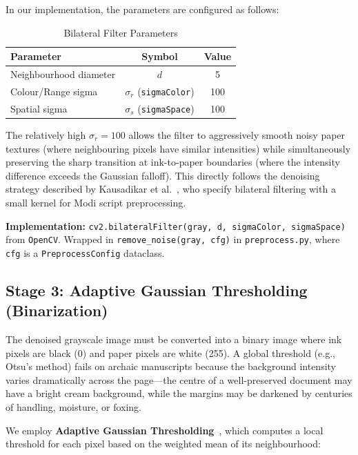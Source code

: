 \documentclass[12pt, a4paper]{article}
\begin{document}
In our implementation, the parameters are configured as follows:

\begin{table}[H]
\centering
\caption{Bilateral Filter Parameters}
\label{tab:bilateral_params}
\begin{tabular}{@{}lcc@{}}
\toprule
\textbf{Parameter} & \textbf{Symbol} & \textbf{Value} \\
\midrule
Neighbourhood diameter & $d$ & 5 \\
Colour/Range sigma & $\sigma_r$ (\texttt{sigmaColor}) & 100 \\
Spatial sigma & $\sigma_s$ (\texttt{sigmaSpace}) & 100 \\
\bottomrule
\end{tabular}
\end{table}

The relatively high $\sigma_r = 100$ allows the filter to aggressively smooth noisy paper textures (where neighbouring pixels have similar intensities) while simultaneously preserving the sharp transition at ink-to-paper boundaries (where the intensity difference exceeds the Gaussian falloff). This directly follows the denoising strategy described by Kausadikar et al.~\cite{kausadikar2025}, who specify bilateral filtering with a small kernel for Modi script preprocessing.

\textbf{Implementation:} \texttt{cv2.bilateralFilter(gray, d, sigmaColor, sigmaSpace)} from \texttt{OpenCV}. Wrapped in \texttt{remove\_noise(gray, cfg)} in \texttt{preprocess.py}, where \texttt{cfg} is a \texttt{PreprocessConfig} dataclass.


\subsection{Stage 3: Adaptive Gaussian Thresholding (Binarization)}

The denoised grayscale image must be converted into a binary image where ink pixels are black (0) and paper pixels are white (255). A global threshold (e.g., Otsu's method) fails on archaic manuscripts because the background intensity varies dramatically across the page---the centre of a well-preserved document may have a bright cream background, while the margins may be darkened by centuries of handling, moisture, or foxing.

We employ \textbf{Adaptive Gaussian Thresholding}~\cite{kausadikar2025}, which computes a local threshold for each pixel based on the weighted mean of its neighbourhood:
\end{document}
